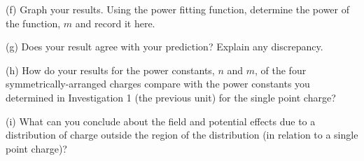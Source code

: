 (f) Graph your results. Using the power fitting
function, determine the power of the function, $m$ and record it here.
\vspace{15mm}

(g) Does your result agree with your prediction? Explain any discrepancy.\vspace{15mm}

(h) How do your results for the power constants, $n$ and $m$, of the four
symmetrically-arranged charges compare with the power constants you
determined in Investigation 1 (the previous unit) for the single point charge?\vspace{15mm}

(i) What can you conclude about the field and potential effects due to
a distribution of charge outside the region of the distribution (in
relation to a single point charge)?\vspace{15mm}

